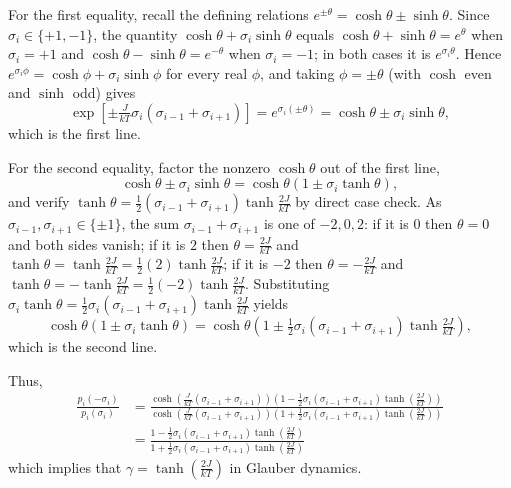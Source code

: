 \documentclass[12pt]{article}
\theoremstyle{definition}
\theoremstyle{remark}
\begin{document}
For the first equality, recall the defining relations $e^{\pm\theta} = \cosh\theta \pm \sinh\theta$. Since $\sigma_i \in \{+1, -1\}$, the quantity $\cosh\theta + \sigma_i\sinh\theta$ equals $\cosh\theta + \sinh\theta = e^{\theta}$ when $\sigma_i = +1$ and $\cosh\theta - \sinh\theta = e^{-\theta}$ when $\sigma_i = -1$; in both cases it is $e^{\sigma_i\theta}$. Hence $e^{\sigma_i\phi} = \cosh\phi + \sigma_i\sinh\phi$ for every real $\phi$, and taking $\phi = \pm\theta$ (with $\cosh$ even and $\sinh$ odd) gives
\[
\exp\!\left[\pm\tfrac{J}{kT}\sigma_i(\sigma_{i-1} + \sigma_{i+1})\right]
= e^{\sigma_i(\pm\theta)}
= \cosh\theta \pm \sigma_i\sinh\theta,
\]
which is the first line.

For the second equality, factor the nonzero $\cosh\theta$ out of the first line,
\[
\cosh\theta \pm \sigma_i\sinh\theta = \cosh\theta\left(1 \pm \sigma_i\tanh\theta\right),
\]
and verify $\tanh\theta = \tfrac{1}{2}(\sigma_{i-1} + \sigma_{i+1})\tanh\tfrac{2J}{kT}$ by direct case check. As $\sigma_{i-1}, \sigma_{i+1} \in \{\pm 1\}$, the sum $\sigma_{i-1} + \sigma_{i+1}$ is one of $-2, 0, 2$: if it is $0$ then $\theta = 0$ and both sides vanish; if it is $2$ then $\theta = \tfrac{2J}{kT}$ and $\tanh\theta = \tanh\tfrac{2J}{kT} = \tfrac{1}{2}(2)\tanh\tfrac{2J}{kT}$; if it is $-2$ then $\theta = -\tfrac{2J}{kT}$ and $\tanh\theta = -\tanh\tfrac{2J}{kT} = \tfrac{1}{2}(-2)\tanh\tfrac{2J}{kT}$. Substituting $\sigma_i\tanh\theta = \tfrac{1}{2}\sigma_i(\sigma_{i-1} + \sigma_{i+1})\tanh\tfrac{2J}{kT}$ yields
\[
\cosh\theta\left(1 \pm \sigma_i\tanh\theta\right)
= \cosh\theta\left(1 \pm \tfrac{1}{2}\sigma_i(\sigma_{i-1} + \sigma_{i+1})\tanh\tfrac{2J}{kT}\right),
\]
which is the second line.

Thus,
\begin{align*}
    \frac{p_i(-\sigma_i)}{p_i(\sigma_i)} &= \frac{\cosh\left(\frac{J}{kT}(\sigma_{i-1} + \sigma_{i+1}) \right) \left( 1 - \frac{1}{2} \sigma_i (\sigma_{i-1} + \sigma_{i+1}) \tanh \left( \frac{2J}{kT} \right) \right)}{\cosh\left(\frac{J}{kT}(\sigma_{i-1} + \sigma_{i+1}) \right) \left( 1 + \frac{1}{2} \sigma_i (\sigma_{i-1} + \sigma_{i+1}) \tanh \left( \frac{2J}{kT} \right) \right)} \\
    &= \frac{ 1 - \frac{1}{2} \sigma_i (\sigma_{i-1} + \sigma_{i+1})  \tanh \left(\frac{2J}{kT}\right)}{ 1 + \frac{1}{2} \sigma_i (\sigma_{i-1} + \sigma_{i+1})  \tanh \left(\frac{2J}{kT}\right)}
\end{align*}
which implies that $\gamma = \tanh \left(\frac{2J}{kT}\right)$ in Glauber dynamics. 
\end{document}
